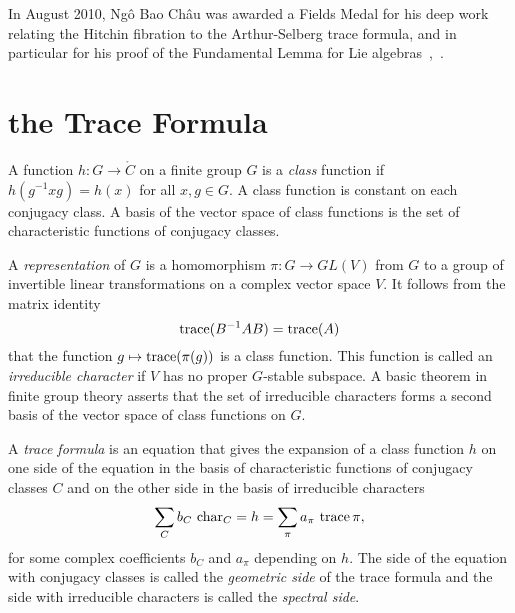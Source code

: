 

In August 2010, Ng\^o Bao Ch\^au was awarded a Fields Medal for his
deep work relating the Hitchin fibration to the Arthur-Selberg trace
formula, and in particular for his proof of the Fundamental Lemma for
Lie algebras~\cite{NBC:2006},~\cite{NBC:2010}.


\section{the Trace Formula}

A function $h:G\to\ring{C}$ on a finite group $G$ is a {\it class} function
if $h(g^{-1} x g) = h(x)$ for all $x,g\in G$.  A class
function is constant on each conjugacy class.  A basis of the
vector space of class functions is the set of characteristic functions
of conjugacy classes.

A {\it representation} of $G$ is a homomorphism $\pi:G\to GL(V)$ from $G$
to a group of invertible linear transformations on a complex vector
space $V$.  It follows from the matrix identity 
\[
{\operatorname{trace}}( B^{-1} A B) = {\operatorname{trace}} (A)
\]
that the function $g\mapsto {\operatorname{trace}}(\pi(g))$
is a class function.  This function is called an
{\it irreducible character} if $V$ has no proper $G$-stable subspace.
A basic theorem in finite group theory asserts that the set of
irreducible characters forms a second basis of the vector space of
class functions on $G$. 

A {\it trace formula} is an equation that gives the expansion of a
class function $h$ on one side of the equation in the basis of
characteristic functions of conjugacy classes $C$ and on the other
side in the basis of irreducible characters
\[
\sum_C b_C\ {\operatorname{char}}_C     =  h = \sum_\pi a_\pi\ {\operatorname{trace}}\, \pi,
\]
for some complex coefficients $b_C$ and $a_\pi$ depending on $h$.
The side of the equation with conjugacy classes is called the {\it
  geometric side} of the trace formula and the side with irreducible
characters is called the {\it spectral side}.

